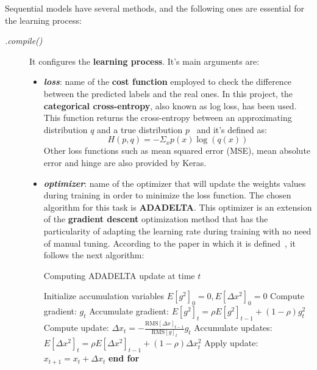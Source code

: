 Sequential models have several methods, and the following ones are essential for the learning process:
\begin{description}
	\item[\textit{.compile()}] It configures the \textbf{learning process}. It's main arguments are:
	\begin{itemize}
		\item \textbf{\textit{loss}}: name of the \textbf{cost function} employed to check the difference between the predicted labels and the real ones. In this project, the \textbf{categorical cross-entropy}, also known as log loss, has been used. This function returns the cross-entropy between an approximating distribution $q$ and a true distribution $p$~\cite{theano} and it's defined as:
		\begin{equation}\label{eq:categorical_crossentropy}
		H(p,q)=-\Sigma_{x}p(x)\log(q(x))
		\end{equation}		
		Other loss functions such as mean squared error (MSE), mean absolute error and hinge are also provided by Keras.
		
		\item \textbf{\textit{optimizer}}: name of the optimizer that will update the weights values during training in order to minimize the loss function. The chosen algorithm for this task is \textbf{ADADELTA}. This optimizer is an extension of the \textbf{gradient descent} optimization method that has the particularity of adapting the learning rate during training with no need of manual tuning. According to the paper in which it is defined~\cite{DBLP:journals/corr/abs-1212-5701}, it follows the next algorithm:		
		\begin{minipage}{\linewidth}
		\begin{algorithm}[H]
			\caption{Computing ADADELTA update at time $t$}\label{adadelta}
		  	\begin{algorithmic}[1]
		  		\State Initialize accumulation variables $E[g^2]_0=0, E[\Delta x^2]_0 = 0$
		  		 
		  		\State Compute gradient: $g_t$
		  		\State Accumulate gradient: $E[g^2]_t=\rho E[g^2]_{t-1}+(1-\rho)g_t^2$
		  		\State Compute update: $\Delta x_t=-\frac{\mathrm{RMS}[\Delta x]_{t-1}}{\mathrm{RMS}[g]_t}g_t$
		  		\State Accumulate updates: $E[\Delta x^2]_t=\rho E[\Delta x^2]_{t-1}+(1-\rho)\Delta x_t^2$
		  		\State Apply update: $x_{t+1}=x_t+\Delta x_t$
				\EndFor
		  		\State \textbf{end for}
		  	\end{algorithmic}
		\end{algorithm}
		\end{minipage}\\
				

\end{itemize}
\end{description}
